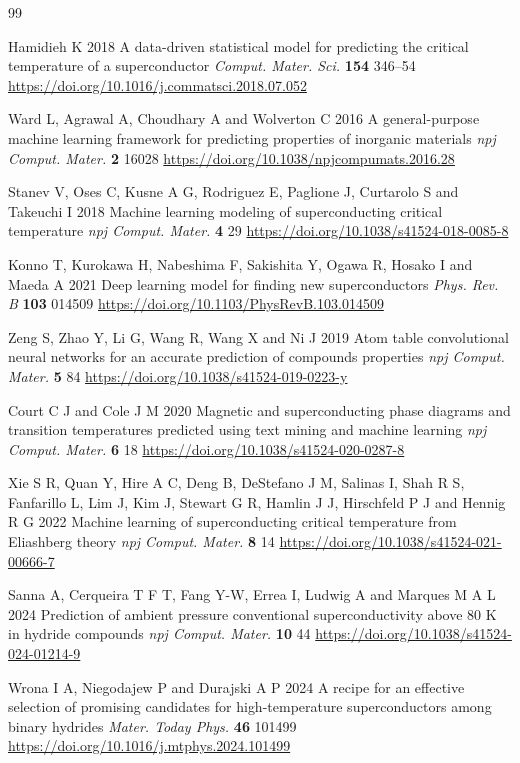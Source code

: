 \documentclass{iopjournal}
\begin{document}
{\footnotesize
\begin{thebibliography}{99}

Hamidieh K 2018 A data-driven statistical model for predicting the critical temperature of a
superconductor \textit{Comput. Mater. Sci.} \textbf{154} 346--54
\url{https://doi.org/10.1016/j.commatsci.2018.07.052}

Ward L, Agrawal A, Choudhary A and Wolverton C 2016 A general-purpose machine learning framework
for predicting properties of inorganic materials \textit{npj Comput. Mater.} \textbf{2} 16028
\url{https://doi.org/10.1038/npjcompumats.2016.28}

Stanev V, Oses C, Kusne A G, Rodriguez E, Paglione J, Curtarolo S and Takeuchi I 2018
Machine learning modeling of superconducting critical temperature
\textit{npj Comput. Mater.} \textbf{4} 29
\url{https://doi.org/10.1038/s41524-018-0085-8}

Konno T, Kurokawa H, Nabeshima F, Sakishita Y, Ogawa R, Hosako I and Maeda A 2021
Deep learning model for finding new superconductors \textit{Phys. Rev. B} \textbf{103} 014509
\url{https://doi.org/10.1103/PhysRevB.103.014509}

Zeng S, Zhao Y, Li G, Wang R, Wang X and Ni J 2019 Atom table convolutional neural networks for
an accurate prediction of compounds properties \textit{npj Comput. Mater.} \textbf{5} 84
\url{https://doi.org/10.1038/s41524-019-0223-y}

Court C J and Cole J M 2020 Magnetic and superconducting phase diagrams and transition
temperatures predicted using text mining and machine learning
\textit{npj Comput. Mater.} \textbf{6} 18
\url{https://doi.org/10.1038/s41524-020-0287-8}

Xie S R, Quan Y, Hire A C, Deng B, DeStefano J M, Salinas I, Shah R S, Fanfarillo L, Lim J,
Kim J, Stewart G R, Hamlin J J, Hirschfeld P J and Hennig R G 2022 Machine learning of
superconducting critical temperature from Eliashberg theory
\textit{npj Comput. Mater.} \textbf{8} 14
\url{https://doi.org/10.1038/s41524-021-00666-7}

Sanna A, Cerqueira T F T, Fang Y-W, Errea I, Ludwig A and Marques M A L 2024
Prediction of ambient pressure conventional superconductivity above 80 K in hydride compounds
\textit{npj Comput. Mater.} \textbf{10} 44
\url{https://doi.org/10.1038/s41524-024-01214-9}

Wrona I A, Niegodajew P and Durajski A P 2024 A recipe for an effective
selection of promising candidates for high-temperature superconductors among binary hydrides
\textit{Mater. Today Phys.} \textbf{46} 101499
\url{https://doi.org/10.1016/j.mtphys.2024.101499}


\end{thebibliography}}
\end{document}

